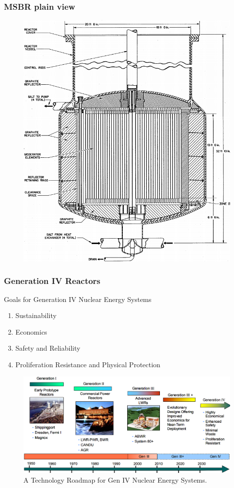 \documentclass[9pt,handout]{beamer}
\begin{document}
\begin{frame}
  \frametitle{\gls{MSBR} plain view}
               \begin{figure}[t]
                \vspace*{-0.1in}
                \includegraphics[height=0.75\textwidth]{./images/msbr_plain.png}
               \end{figure}
              
\end{frame}

\begin{frame}
  \frametitle{Generation IV Reactors}
              \begin{block}{Goals for Generation IV Nuclear Energy Systems}
               \begin{enumerate}
                \item Sustainability
                \item Economics
                \item Safety and Reliability
                \item Proliferation Resistance and Physical Protection
               \end{enumerate}
               \end{block}
               \begin{figure}[t]
                \vspace*{-0.11in}
		\hspace*{-0.15in}
                \includegraphics[height=0.43\textwidth]{./images/gen4_road_map.png}
                \vspace*{-0.1in}
                \caption{A Technology Roadmap for Gen IV Nuclear Energy Systems.}
               \end{figure}            
\end{frame}
\end{document}
